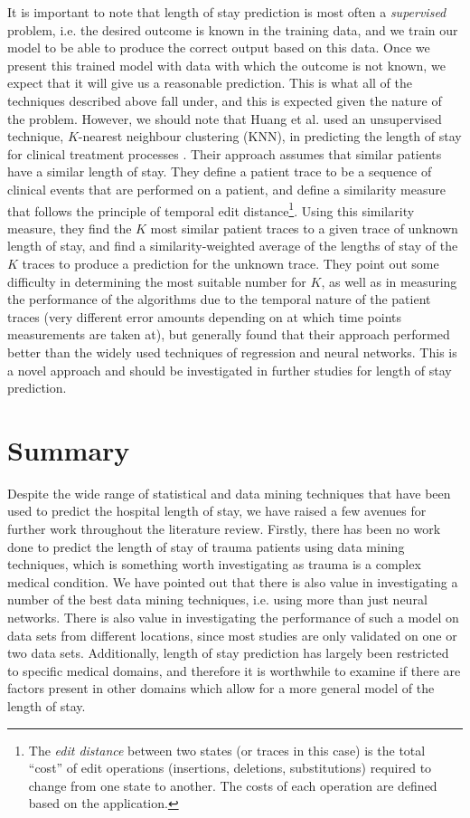 It is important to note that length of stay prediction is most often a
\textit{supervised} problem, i.e. the desired outcome is known in the training
data, and we train our model to be able to produce the correct output based on
this data. Once we present this trained model with data with which the outcome
is not known, we expect that it will give us a reasonable prediction. This is
what all of the techniques described above fall under, and this is expected
given the nature of the problem. However, we should note that Huang et al. 
used an unsupervised technique, $K$-nearest neighbour clustering (KNN), in 
predicting the length of stay for clinical
treatment processes \citep{Huang2013}. Their approach assumes that similar
patients have a similar length of
stay. They define a patient trace to be a sequence of clinical events that are
performed on a patient, and define a similarity measure that follows the
principle of temporal edit distance\footnote{The \textit{edit distance}
between two states (or traces in this case) is the total ``cost'' of edit
operations (insertions, deletions, substitutions) required to change from
one state to another. The costs of each operation are defined based on the
application.}. Using this similarity measure, they find the $K$ most similar
patient traces to a given trace of unknown length of stay,
and find a similarity-weighted average of the lengths of stay
of the $K$ traces to produce a prediction for the unknown trace. They point
out some difficulty in determining the most suitable number for $K$, as well
as in measuring the performance of the algorithms due to the temporal nature
of the patient traces (very different error amounts depending on at which
time points measurements are taken at), but generally found that their
approach performed better than the widely used techniques of regression and
neural networks. This is a novel approach and should be investigated in further
studies for length of stay prediction.

\section{Summary}
Despite the wide range of statistical and data mining techniques that have been
used to predict the hospital length of stay, we have raised a few avenues for
further work throughout the literature review. Firstly, there has been no work
done to predict the length of stay of trauma patients using data mining
techniques, which is something worth investigating as trauma is a complex
medical condition. We have pointed out that there is also value in
investigating a number of the best data mining techniques, i.e. using more
than just neural networks. There is also value in investigating the performance
of such a model on data sets from different locations, since most studies are
only validated on one or two data sets. Additionally, length of stay prediction
has largely been restricted to specific medical domains, and therefore it is
worthwhile to examine if there are factors present in other domains which allow
for a more general model of the length of stay. 


